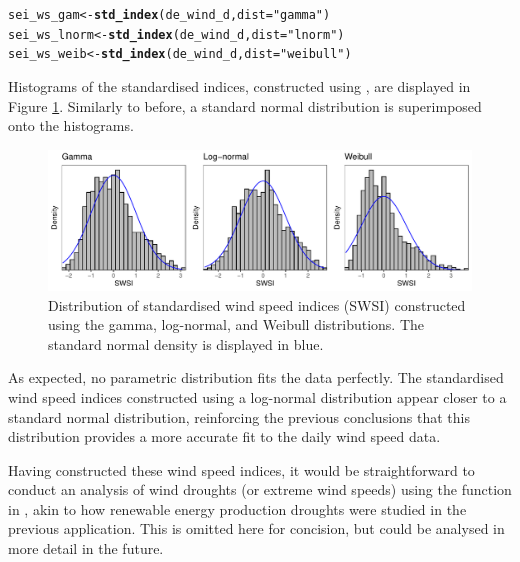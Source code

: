 \documentclass[article,shortnames,nojss]{jss}\usepackage[]{graphicx}\usepackage[]{xcolor}
\makeatletter
\newcommand{\hlstr}[1]{\textcolor[rgb]{0.192,0.494,0.8}{#1}}%
\newcommand{\hlstd}[1]{\textcolor[rgb]{0.345,0.345,0.345}{#1}}%
\newcommand{\hlkwb}[1]{\textcolor[rgb]{0.69,0.353,0.396}{#1}}%
\newcommand{\hlkwc}[1]{\textcolor[rgb]{0.333,0.667,0.333}{#1}}%
\newcommand{\hlkwd}[1]{\textcolor[rgb]{0.737,0.353,0.396}{\textbf{#1}}}%
\newenvironment{kframe}{%
 \def\at@end@of@kframe{}%
 \ifinner\ifhmode%
  \def\at@end@of@kframe{\end{minipage}}%
  \begin{minipage}{\columnwidth}%
 \fi\fi%
 \def\FrameCommand##1{\hskip\@totalleftmargin \hskip-\fboxsep
 \colorbox{shadecolor}{##1}\hskip-\fboxsep
     \hskip-\linewidth \hskip-\@totalleftmargin \hskip\columnwidth}%
 \MakeFramed {\advance\hsize-\width
   \@totalleftmargin\z@ \linewidth\hsize
   \@setminipage}}%
 {\par\unskip\endMakeFramed%
 \at@end@of@kframe}
\newenvironment{knitrout}{}{} %
\makeatother
\begin{document}
\begin{knitrout}
\color{fgcolor}\begin{kframe}
\begin{alltt}
\hlstd{sei_ws_gam} \hlkwb{<-} \hlkwd{std_index}\hlstd{(de_wind_d,} \hlkwc{dist} \hlstd{=} \hlstr{"gamma"}\hlstd{)}
\hlstd{sei_ws_lnorm} \hlkwb{<-} \hlkwd{std_index}\hlstd{(de_wind_d,} \hlkwc{dist} \hlstd{=} \hlstr{"lnorm"}\hlstd{)}
\hlstd{sei_ws_weib} \hlkwb{<-} \hlkwd{std_index}\hlstd{(de_wind_d,} \hlkwc{dist} \hlstd{=} \hlstr{"weibull"}\hlstd{)}
\end{alltt}
\end{kframe}
\end{knitrout}

Histograms of the standardised indices, constructed using , are displayed in Figure \ref{fig:dist_ws_ind}. Similarly to before, a standard normal distribution is superimposed onto the histograms.

\begin{figure}
\begin{knitrout}
\color{fgcolor}

{\centering \includegraphics[width=\linewidth]{figure/ws_ind_plot_dist-1} 

}


\end{knitrout}
\caption{Distribution of standardised wind speed indices (SWSI) constructed using the gamma, log-normal, and Weibull distributions. The standard normal density is displayed in blue.}
\label{fig:dist_ws_ind}
\end{figure}

As expected, no parametric distribution fits the data perfectly. The standardised wind speed indices constructed using a log-normal distribution appear closer to a standard normal distribution, reinforcing the previous conclusions that this distribution provides a more accurate fit to the daily wind speed data.

Having constructed these wind speed indices, it would be straightforward to conduct an analysis of wind droughts (or extreme wind speeds) using the  function in , akin to how renewable energy production droughts were studied in the previous application. This is omitted here for concision, but could be analysed in more detail in the future.
\end{document}
